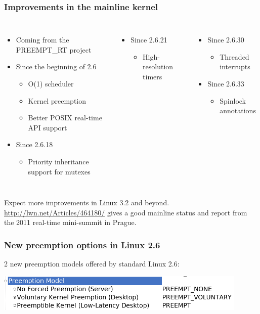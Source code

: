 \begin{frame}
  \frametitle{Improvements in the mainline kernel}
  \begin{columns}[T]
    \begin{itemize}
    \item Coming from the PREEMPT\_RT project
    \item Since the beginning of 2.6
      \begin{itemize}
      \item O(1) scheduler
      \item Kernel preemption
      \item Better POSIX real-time API support
      \end{itemize}
    \item Since 2.6.18
      \begin{itemize}
      \item Priority inheritance support for mutexes
      \end{itemize}
    \end{itemize}
    \begin{itemize}
    \item Since 2.6.21
      \begin{itemize}
      \item High-resolution timers
      \end{itemize}
    \end{itemize}
    \begin{itemize}
    \item Since 2.6.30
      \begin{itemize}
      \item Threaded interrupts
      \end{itemize}
    \item Since 2.6.33
      \begin{itemize}
      \item Spinlock annotations
      \end{itemize}
    \end{itemize}
  \end{columns}
  \vspace{0.5cm}
  Expect more improvements in Linux 3.2 and beyond.
  \url{http://lwn.net/Articles/464180/} gives a good mainline status
  and report from the 2011 real-time mini-summit in Prague.
\end{frame}

\begin{frame}
  \frametitle{New preemption options in Linux 2.6}
  2 new preemption models offered by standard Linux 2.6:
  \begin{center}
    \includegraphics[width=0.9\textwidth]{slides/sysdev-realtime/kernel-config-preemption.png}
  \end{center}
\end{frame}

